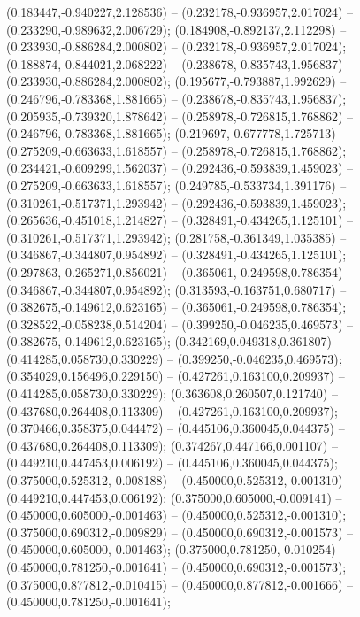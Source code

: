  (0.183447,-0.940227,2.128536) -- (0.232178,-0.936957,2.017024) -- (0.233290,-0.989632,2.006729);
 (0.184908,-0.892137,2.112298) -- (0.233930,-0.886284,2.000802) -- (0.232178,-0.936957,2.017024);
 (0.188874,-0.844021,2.068222) -- (0.238678,-0.835743,1.956837) -- (0.233930,-0.886284,2.000802);
 (0.195677,-0.793887,1.992629) -- (0.246796,-0.783368,1.881665) -- (0.238678,-0.835743,1.956837);
 (0.205935,-0.739320,1.878642) -- (0.258978,-0.726815,1.768862) -- (0.246796,-0.783368,1.881665);
 (0.219697,-0.677778,1.725713) -- (0.275209,-0.663633,1.618557) -- (0.258978,-0.726815,1.768862);
 (0.234421,-0.609299,1.562037) -- (0.292436,-0.593839,1.459023) -- (0.275209,-0.663633,1.618557);
 (0.249785,-0.533734,1.391176) -- (0.310261,-0.517371,1.293942) -- (0.292436,-0.593839,1.459023);
 (0.265636,-0.451018,1.214827) -- (0.328491,-0.434265,1.125101) -- (0.310261,-0.517371,1.293942);
 (0.281758,-0.361349,1.035385) -- (0.346867,-0.344807,0.954892) -- (0.328491,-0.434265,1.125101);
 (0.297863,-0.265271,0.856021) -- (0.365061,-0.249598,0.786354) -- (0.346867,-0.344807,0.954892);
 (0.313593,-0.163751,0.680717) -- (0.382675,-0.149612,0.623165) -- (0.365061,-0.249598,0.786354);
 (0.328522,-0.058238,0.514204) -- (0.399250,-0.046235,0.469573) -- (0.382675,-0.149612,0.623165);
 (0.342169,0.049318,0.361807) -- (0.414285,0.058730,0.330229) -- (0.399250,-0.046235,0.469573);
 (0.354029,0.156496,0.229150) -- (0.427261,0.163100,0.209937) -- (0.414285,0.058730,0.330229);
 (0.363608,0.260507,0.121740) -- (0.437680,0.264408,0.113309) -- (0.427261,0.163100,0.209937);
 (0.370466,0.358375,0.044472) -- (0.445106,0.360045,0.044375) -- (0.437680,0.264408,0.113309);
 (0.374267,0.447166,0.001107) -- (0.449210,0.447453,0.006192) -- (0.445106,0.360045,0.044375);
 (0.375000,0.525312,-0.008188) -- (0.450000,0.525312,-0.001310) -- (0.449210,0.447453,0.006192);
 (0.375000,0.605000,-0.009141) -- (0.450000,0.605000,-0.001463) -- (0.450000,0.525312,-0.001310);
 (0.375000,0.690312,-0.009829) -- (0.450000,0.690312,-0.001573) -- (0.450000,0.605000,-0.001463);
 (0.375000,0.781250,-0.010254) -- (0.450000,0.781250,-0.001641) -- (0.450000,0.690312,-0.001573);
 (0.375000,0.877812,-0.010415) -- (0.450000,0.877812,-0.001666) -- (0.450000,0.781250,-0.001641);
